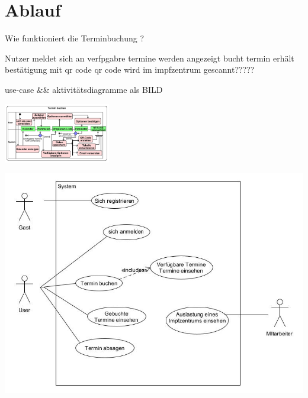 \section*{Ablauf}

Wie funktioniert die Terminbuchung ? 

Nutzer meldet sich an
verfpgabre termine werden angezeigt
bucht termin
erhält bestätigung mit qr code
qr code wird im impfzentrum gescannt?????

use-case && aktivitätsdiagramme als BILD

\begin{center}
 \includegraphics[width=0.35\textwidth, height=1.45\textheight, keepaspectratio]{src/abbildungen/activity.png}
\end{center}

\begin{center}
  \includegraphics[width=0.95\linewidth, height=0.45\textheight, keepaspectratio]{src/abbildungen/usecases.jpg}
\end{center}



